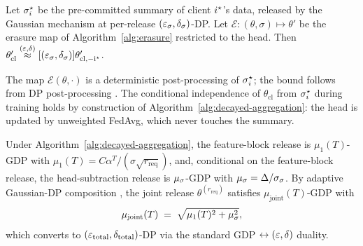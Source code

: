 \begin{lemma}
\label{lem:subtraction}
Let $\sigma_i^{\star}$ be the pre-committed summary of client $i^{\star}$'s data, released
by the Gaussian mechanism at per-release $(\varepsilon_\sigma, \delta_\sigma)$-DP. Let
$\mathcal{E}: (\theta, \sigma) \mapsto \theta'$ be the erasure map of
Algorithm~\ref{alg:erasure} restricted to the head. Then
$\theta'_\mathrm{cl} \stackrel{(\varepsilon,\delta)}{\approx}[(\varepsilon_\sigma, \delta_\sigma)]
\theta'_\mathrm{cl, -i^{\star}}$.
\end{lemma}

The map $\mathcal{E}(\theta, \cdot)$ is a deterministic post-processing of
$\sigma_i^{\star}$; the bound follows from DP post-processing \cite{dwork2014book}. The
conditional independence of $\theta_\mathrm{cl}$ from $\sigma_i^{\star}$ during training
holds by construction of Algorithm~\ref{alg:decayed-aggregation}: the head is updated
by unweighted FedAvg, which never touches the summary.

\begin{theorem}[Composition]
\label{thm:composition}
Under Algorithm~\ref{alg:decayed-aggregation}, the feature-block release is
$\mu_1(T)$-GDP with $\mu_1(T) = C \alpha^T / (\sigma \sqrt{r_\mathrm{req}})$, and,
conditional on the feature-block release, the head-subtraction release is
$\mu_\sigma$-GDP with $\mu_\sigma = \Delta / \sigma_\sigma$. By adaptive
Gaussian-DP composition \cite{dong2019gaussian}, the joint release
$\theta^{(r_\mathrm{req})}$ satisfies $\mu_\mathrm{joint}(T)$-GDP with
\[
\mu_\mathrm{joint}(T) \;=\; \sqrt{\mu_1(T)^2 + \mu_\sigma^2},
\]
which converts to $(\varepsilon_\mathrm{total}, \delta_\mathrm{total})$-DP via the standard
GDP $\leftrightarrow (\varepsilon, \delta)$ duality.
\end{theorem}

